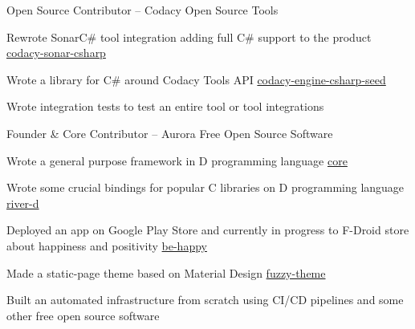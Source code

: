 
\begin{cventries}

  \cventry
    {Open Source Contributor -- \href{https://github.com/codacy}{\faGithubSquare\acvHeaderIconSep\@codacy}} %
    {Codacy Open Source Tools} %
    {} %
    {} %
    {
      \begin{cvitems} %
        \item {Rewrote SonarC\# tool integration adding full C\# support to the product \hfill \href{https://github.com/codacy/codacy-sonar-csharp}{codacy-sonar-csharp\acvHeaderIconSep\@\faGithubSquare}}
        \item {Wrote a library for C\# around Codacy Tools API \hfill \href{https://github.com/codacy/codacy-engine-csharp-seed}{codacy-engine-csharp-seed\acvHeaderIconSep\@\faGithubSquare}}
        \item {Wrote integration tests to test an entire tool or tool integrations}
      \end{cvitems}
    }

  \cventry
    {Founder \& Core Contributor --
    \href{https://gitlab.com/aurorafossorg}{\faGitlab\acvHeaderIconSep\@aurorafossorg}} %
    {Aurora Free Open Source Software} %
    {} %
    {} %
    {
      \begin{cvitems} %
        \item {Wrote a general purpose framework in D programming language \hfill 
        \href{https://gitlab.com/aurorafossorg/p/framework/core}{core\acvHeaderIconSep\@\faGitlab}}
        \item {Wrote some crucial bindings for popular C libraries on D programming language \hfill \href{https://gitlab.com/aurorafossorg/p/riverd}{river-d\acvHeaderIconSep\@\faGitlab}}
        \item{Deployed an app on Google Play Store and currently in progress to F-Droid store about happiness and positivity \hfill \href{https://gitlab.com/aurorafossorg/apps/be-happy}{be-happy\acvHeaderIconSep\@\faGitlab}}
        \item{Made a static-page theme based on Material Design \hfill \href{https://gitlab.com/aurorafossorg/fuzzy-theme}{fuzzy-theme\acvHeaderIconSep\@\faGitlab}}
        \item{Built an automated infrastructure from scratch using CI/CD pipelines and some other free open source software}
      \end{cvitems}
    }


\end{cventries}

